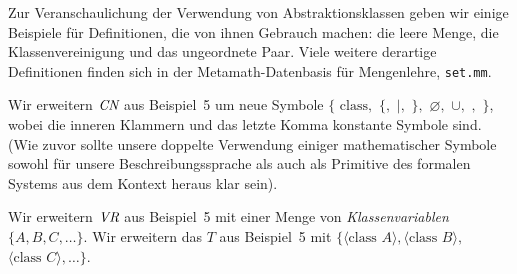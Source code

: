 Zur Veranschaulichung der Verwendung von Abstraktionsklassen geben wir einige Beispiele für Definitionen, die von ihnen Gebrauch machen: die leere Menge, die Klassenvereinigung und das ungeordnete Paar.  Viele weitere derartige Definitionen finden sich in der Metamath-Datenbasis für Mengenlehre, \texttt{set.mm}. 

Wir erweitern $\mbox{\em CN}$ aus Beispiel~5 um neue Symbole $\{$ $\mbox{class},$ $\{,$ $|,$ $\},$ $\varnothing,$ $\cup,$ $,$ $\}$, wobei die inneren Klammern und das letzte Komma konstante Symbole sind. (Wie zuvor sollte unsere doppelte Verwendung einiger mathematischer Symbole sowohl für unsere Beschreibungssprache als auch als Primitive des formalen Systems aus dem Kontext heraus klar sein). 

Wir erweitern $\mbox{\em VR}$ aus Beispiel~5 mit einer Menge von {\em Klassenvariablen} $\{A,B,C,\ldots\}$. Wir erweitern das $T$ aus Beispiel~5 mit $\{\langle \mbox{class\ } A\rangle, \langle \mbox{class\ }B\rangle,$ $\langle \mbox{class\ } C\rangle, \ldots\}$. 

